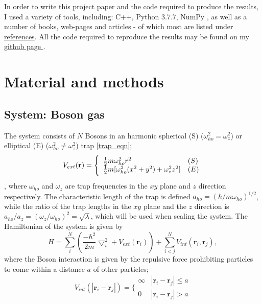 \documentclass[%
oneside,                 %
final,                   %
10pt]{article}
\begin{document}
 
In order to write this project paper and the code required to produce the results, I used a variety of tools, including: C++, Python 3.7.7, NumPy \cite{numpy}, as well as a number of books, web-pages and articles - of which most are listed under 
 \hyperref[refer]{references}. All the code required to reproduce the results may be found on my \href{https://github.com/johanere/FYS4411}{github page }.  
 
\section{Material and methods} \label{theory}
\subsection{System: Boson gas}
The system consists of $N$ Bosons in an harmonic spherical (S) ($\omega_{ho}^2=\omega_z^2$) or elliptical (E) ($\omega_{ho}^2 \neq \omega_z^2$) trap \eqref{trap_eqn};
\begin{equation}
 V_{ext}(\mathbf{r}) = 
 \Bigg\{
 \begin{array}{ll}
	 \frac{1}{2}m\omega_{ho}^2r^2 & (S)\\
 \strut
	 \frac{1}{2}m[\omega_{ho}^2(x^2+y^2) + \omega_z^2z^2] & (E)
 \label{trap_eqn}
 \end{array}
 \end{equation}, 
 where $\omega_{ho}$ and  $\omega_z$ are trap frequencies in the $xy$ plane and $z$ direction respectively. The characteristic length of the trap is defined $a_{ho}=(\hbar /m \omega_{ho})^{1/2}$, while the ratio of the trap lengths in the $xy$ plane and the $z$ direction is $a_{ho}/a_z=(\omega_z/\omega_{ho})^2=\sqrt{\lambda}$, which will be used when scaling the system. The Hamiltonian of the system is given by
\begin{equation}
     H = \sum_i^N \left(\frac{-\hbar^2}{2m}{\bigtriangledown }_{i}^2 +V_{ext}({\mathbf{r}}_i)\right)  +
	 \sum_{i<j}^{N} V_{int}({\mathbf{r}}_i,{\mathbf{r}}_j),
	 \label{eq:hamiltonian}
 \end{equation}
where the Boson interaction is given by the repulsive force prohibiting particles to come within a distance $a$ of other particles;
\begin{equation}
 V_{int}(|\mathbf{r}_i-\mathbf{r}_j|) =  \Bigg\{
 \begin{array}{ll}
	 \infty & {|\mathbf{r}_i-\mathbf{r}_j|} \leq {a}\\
	 0 & {|\mathbf{r}_i-\mathbf{r}_j|} > {a}
 \end{array}
 \end{equation}
\end{document}
